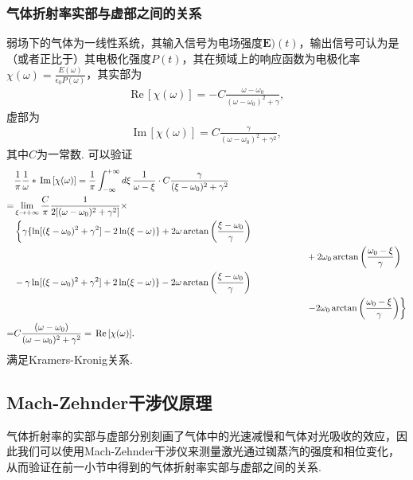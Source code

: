 \documentclass[a4paper, 10pt]{article}
\providecommand{\re}{\,\text{Re}\,} %
\providecommand{\im}{\,\text{Im}\,} %
\begin{document}
\begin{multicols}{2}
\subsubsection{气体折射率实部与虚部之间的关系}
弱场下的气体为一线性系统，其输入信号为电场强度$\bm{E})(t)$，输出信号可认为是（或者正比于）其电极化强度$P(t)$，其在频域上的响应函数为电极化率$\chi(\omega)=\frac{E(\omega)}{\epsilon_0P(\omega)}$，其实部为
\begin{align}
    \re[\chi(\omega)]=-C\frac{\omega-\omega_0}{(\omega-\omega_0)^2+\gamma},
\end{align}
虚部为
\begin{align}
    \im[\chi(\omega)]=C\frac{\gamma}{(\omega-\omega_0)^2+\gamma^2},
\end{align}
其中$C$为一常数.
可以验证
\tiny
\begin{align}
    \notag&\frac{1}{\pi}\frac{1}{\omega}*\im[\chi(\omega)]=\frac{1}{\pi}\int_{-\infty}^{+\infty}d\xi\,\frac{1}{\omega-\xi}\cdot C\frac{\gamma}{(\xi-\omega_0)^2+\gamma^2}\\
    \notag=&\lim_{\xi\rightarrow+\infty}\frac{C}{\pi}\frac{1}{2[(\omega-\omega_0)^2+\gamma^2]}\times\\
    \notag&\left\{\gamma\{\ln[(\xi-\omega_0)^2+\gamma^2]-2\ln(\xi-\omega)\}+2\omega\arctan\left(\frac{\xi-\omega_0}{\gamma}\right)\right.\\
    \notag&\qquad\qquad\qquad\qquad\qquad\qquad\qquad\qquad\qquad\qquad\qquad\qquad\qquad\qquad\qquad\qquad+2\omega_0\arctan\left(\frac{\omega_0-\xi}{\gamma}\right)\\
    \notag&-\gamma\ln[(\xi-\omega_0)^2+\gamma^2]+2\ln(\xi-\omega)\}-2\omega\arctan\left(\frac{\xi-\omega_0}{\gamma}\right)\\
    \notag&\qquad\qquad\qquad\qquad\qquad\qquad\qquad\qquad\qquad\qquad\qquad\qquad\qquad\qquad\qquad\qquad\left.-2\omega_0\arctan\left(\frac{\omega_0-\xi}{\gamma}\right)\right\}\\
    =&C\frac{(\omega-\omega_0)}{(\omega-\omega_0)^2+\gamma^2}=\re[\chi(\omega)].
\end{align}
\normalsize
满足Kramers-Kronig关系.

\subsection{Mach-Zehnder干涉仪原理}

气体折射率的实部与虚部分别刻画了气体中的光速减慢和气体对光吸收的效应，因此我们可以使用Mach-Zehnder干涉仪来测量激光通过铷蒸汽的强度和相位变化，从而验证在前一小节中得到的气体折射率实部与虚部之间的关系.


\end{multicols}
\end{document}
